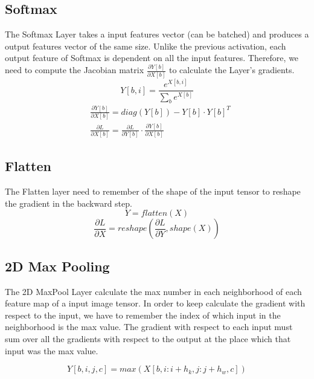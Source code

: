 \documentclass[conference]{IEEEtran}
\begin{document}
\subsection{Softmax}
The Softmax Layer takes a input features vector (can be batched) and produces a output features vector of the same size. Unlike the previous activation, each output feature of Softmax is dependent on all the input features. Therefore, we need to compute the Jacobian matrix \(\frac{\partial Y[b]}{\partial X[b]}\) to calculate the Layer's gradients.
\begin{equation}
Y[b, i] = \frac{e^{X[b,i]}}{\sum_b e^{X[b]}}
\end{equation}
\begin{equation}
\begin{split}
&\frac{\partial Y[b]}{\partial X[b]} = diag(Y[b]) - Y[b]  \cdot Y[b]^T \\
&\frac{\partial L}{\partial X[b]} = \frac{\partial L}{\partial Y[b]} \cdot \frac{\partial Y[b]}{\partial X[b]}
\end{split}
\end{equation}

\subsection{Flatten}
The Flatten layer need to remember of the shape of the input tensor to reshape the gradient in the backward step.
\begin{equation}
Y = flatten(X)
\end{equation}
\begin{equation}
\frac{\partial L}{\partial X} = reshape(\frac{\partial L}{\partial Y}, shape(X))
\end{equation}

\subsection{2D Max Pooling}
The 2D MaxPool Layer calculate the max number in each neighborhood of each feature map of a input image tensor. In order to keep calculate the gradient with respect to the input, we have to remember the index of which input in the neighborhood is the max value. The gradient with respect to each input must sum over all the gradients with respect to the output at the place which that input was the max value.

\begin{equation}
Y[b,i,j,c] = max(X[b,i:i+h_k,j:j+h_w,c])
\end{equation}
\end{document}

